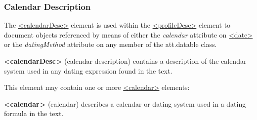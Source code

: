 \subsubsection[{Calendar Description}]{Calendar Description}\label{HD44}\par
The \hyperref[TEI.calendarDesc]{<calendarDesc>} element is used within the \hyperref[TEI.profileDesc]{<profileDesc>} element to document objects referenced by means of either the {\itshape calendar} attribute on \hyperref[TEI.date]{<date>} or the {\itshape datingMethod} attribute on any member of the \textsf{att.datable} class. 
\begin{sansreflist}
  
\item [\textbf{<calendarDesc>}] (calendar description) contains a description of the calendar system used in any dating expression found in the text.
\end{sansreflist}
\par
This element may contain one or more \hyperref[TEI.calendar]{<calendar>} elements: 
\begin{sansreflist}
  
\item [\textbf{<calendar>}] (calendar) describes a calendar or dating system used in a dating formula in the text.
\end{sansreflist}
\par
